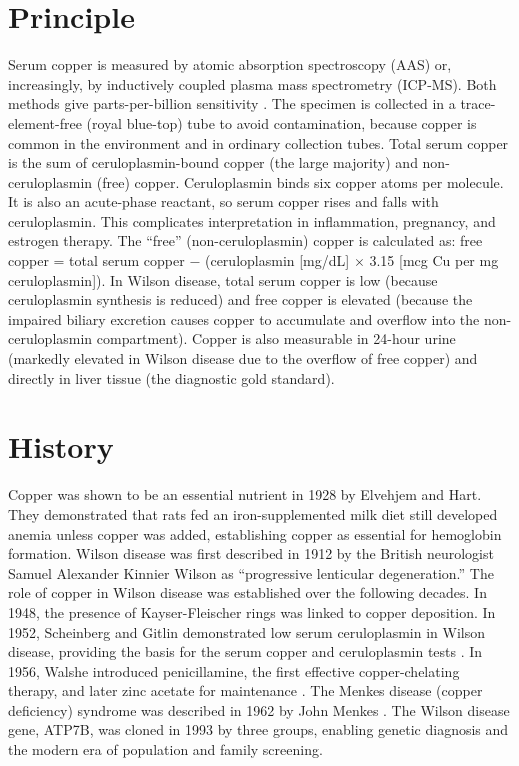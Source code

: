 \section*{Principle}
Serum copper is measured by atomic absorption spectroscopy (AAS) or, increasingly, by inductively coupled plasma mass spectrometry (ICP-MS). Both methods give parts-per-billion sensitivity \cite{tietz2023textbook}. The specimen is collected in a trace-element-free (royal blue-top) tube to avoid contamination, because copper is common in the environment and in ordinary collection tubes. Total serum copper is the sum of ceruloplasmin-bound copper (the large majority) and non-ceruloplasmin (free) copper. Ceruloplasmin binds six copper atoms per molecule. It is also an acute-phase reactant, so serum copper rises and falls with ceruloplasmin. This complicates interpretation in inflammation, pregnancy, and estrogen therapy. The ``free'' (non-ceruloplasmin) copper is calculated as: free copper = total serum copper $-$ (ceruloplasmin [mg/dL] $\times$ 3.15 [mcg Cu per mg ceruloplasmin]). In Wilson disease, total serum copper is low (because ceruloplasmin synthesis is reduced) and free copper is elevated (because the impaired biliary excretion causes copper to accumulate and overflow into the non-ceruloplasmin compartment). Copper is also measurable in 24-hour urine (markedly elevated in Wilson disease due to the overflow of free copper) and directly in liver tissue (the diagnostic gold standard).

\section*{History}
Copper was shown to be an essential nutrient in 1928 by Elvehjem and Hart. They demonstrated that rats fed an iron-supplemented milk diet still developed anemia unless copper was added, establishing copper as essential for hemoglobin formation. Wilson disease was first described in 1912 by the British neurologist Samuel Alexander Kinnier Wilson as ``progressive lenticular degeneration.'' The role of copper in Wilson disease was established over the following decades. In 1948, the presence of Kayser-Fleischer rings was linked to copper deposition. In 1952, Scheinberg and Gitlin demonstrated low serum ceruloplasmin in Wilson disease, providing the basis for the serum copper and ceruloplasmin tests \cite{scheinberg1952deficiency}. In 1956, Walshe introduced penicillamine, the first effective copper-chelating therapy, and later zinc acetate for maintenance \cite{walshe1956penicillamine}. The Menkes disease (copper deficiency) syndrome was described in 1962 by John Menkes \cite{menkes1962sexlinked}. The Wilson disease gene, ATP7B, was cloned in 1993 by three groups, enabling genetic diagnosis and the modern era of population and family screening.


